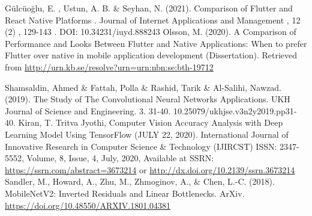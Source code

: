 \begin{thebibliography}{99}

	 Gülcüoğlu, E. , Ustun, A. B. \& Seyhan, N. (2021). Comparison of Flutter and React Native Platforms . Journal of Internet Applications and Management , 12 (2) , 129-143 . DOI: 10.34231/iuyd.888243
	 Olsson, M. (2020). A Comparison of Performance and Looks Between Flutter and Native Applications: When to prefer Flutter over native in mobile application development (Dissertation). Retrieved from \url{http://urn.kb.se/resolve?urn=urn:nbn:se:bth-19712}

	 Shamsaldin, Ahmed \& Fattah, Polla \& Rashid, Tarik \& Al-Salihi, Nawzad. (2019). The Study of The Convolutional Neural Networks Applications. UKH Journal of Science and Engineering. 3. 31-40. 10.25079/ukhjse.v3n2y2019.pp31-40.
	 Kiran, T. Tritva Jyothi, Computer Vision Accuracy Analysis with Deep Learning Model Using TensorFlow (JULY 22, 2020). International Journal of Innovative Research in Computer Science \& Technology (IJIRCST) ISSN: 2347-5552, Volume, 8, Issue, 4, July, 2020, Available at SSRN: \url{https://ssrn.com/abstract=3673214} or \url{http://dx.doi.org/10.2139/ssrn.3673214} 
	 Sandler, M., Howard, A., Zhu, M., Zhmoginov, A., \& Chen, L.-C. (2018). MobileNetV2: Inverted Residuals and Linear Bottlenecks. ArXiv. \url{https://doi.org/10.48550/ARXIV.1801.04381}





\end{thebibliography}
